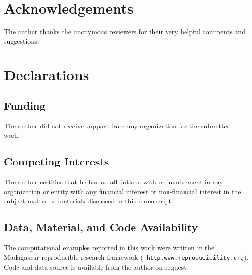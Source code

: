 \documentclass[12pt]{geophysics}
\begin{document}
\section{Acknowledgements}
The author thanks the anonymous reviewers for their very helpful
comments and suggestions.

\section{Declarations}
\subsection{Funding}
The author did not receive support from any organization for the
submitted work.
\subsection{Competing Interests}
The author certifies that he has no affiliations with or involvement
in any organization or entity with any financial interest or
non-financial interest in the subject matter or materials discussed in
this manuscript.
\subsection{Data, Material, and Code Availability}
The computational examples reported in this work were written in the
Madagascar reproducible research framework ({\tt
  http:www.reproducibility.org}). Code and data source is available
from the author on request.




\end{document}
